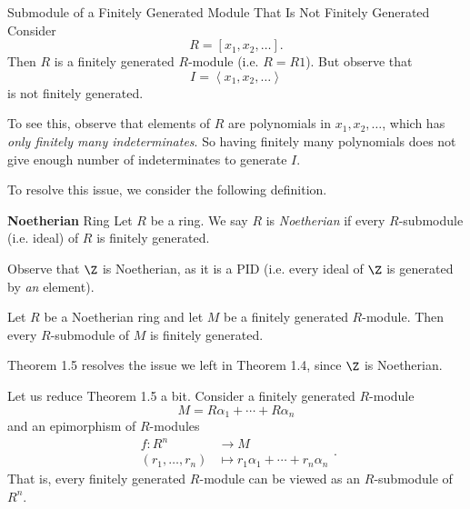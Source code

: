 \documentclass[pmath441]{subfiles}
\begin{document}
    \begin{example}{Submodule of a Finitely Generated Module That Is Not Finitely Generated}
        Consider
        \begin{equation*}
            R = \left[ x_1,x_2,\ldots \right].
        \end{equation*}
        Then $R$ is a finitely generated $R$-module (i.e. $R = R 1$). But observe that
        \begin{equation*}
            I = \left< x_1,x_2,\ldots \right> 
        \end{equation*}
        is not finitely generated. 

        To see this, observe that elements of $R$ are polynomials in $x_1,x_2,\ldots$, which has \textit{only finitely many indeterminates}. So having finitely many polynomials does not give enough number of indeterminates to generate $I$.
    \end{example}

    \rruleline

    \np To resolve this issue, we consider the following definition.
    
    \begin{definition}{\textbf{Noetherian} Ring}
        Let $R$ be a ring. We say $R$ is \emph{Noetherian} if every $R$-submodule (i.e. ideal) of $R$ is finitely generated.
    \end{definition}

    \begin{example}{}
        Observe that $\Z$ is Noetherian, as it is a PID (i.e. every ideal of $\Z$ is generated by \textit{an} element).
    \end{example}

    \rruleline

    \begin{theorem}{}
        Let $R$ be a Noetherian ring and let $M$ be a finitely generated $R$-module. Then every $R$-submodule of $M$ is finitely generated.
    \end{theorem}

    \rruleline

    \np Theorem 1.5 resolves the issue we left in Theorem 1.4, since $\Z$ is Noetherian.

    \np Let us reduce Theorem 1.5 a bit. Consider a finitely generated $R$-module
    \begin{equation*}
        M = R\alpha_1 + \cdots + R\alpha_n
    \end{equation*}
    and an epimorphism of $R$-modules
    \begin{equation*}
        \begin{aligned}
            f:R^n & \to M \\
            \left( r_1,\ldots,r_n \right) & \mapsto r_1\alpha_1 + \cdots + r_n\alpha_n
        \end{aligned} .
    \end{equation*}
    That is, every finitely generated $R$-module can be viewed as an $R$-submodule of $R^n$.
\end{document}
